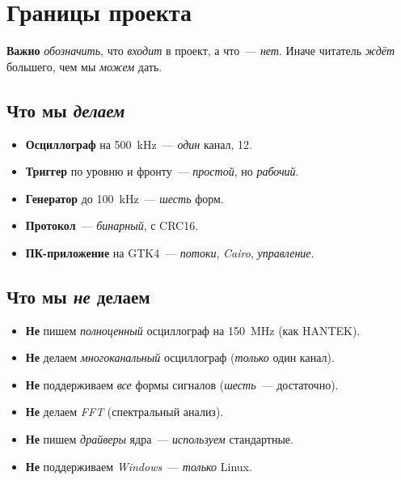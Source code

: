 \section{Границы проекта}
\label{sec:arch-boundaries}

\textbf{Важно} \emph{обозначить}, что \emph{входит} в проект,
а что~--- \emph{нет}. Иначе читатель \emph{ждёт} большего,
чем мы \emph{можем} дать.

\subsection{Что мы \emph{делаем}}

\begin{itemize}
    \item \textbf{Осциллограф} на \SI{500}{\kilo\hertz}~---
          \emph{один} канал, \SI{12}{\bit}.
    \item \textbf{Триггер} по уровню и фронту~---
          \emph{простой}, но \emph{рабочий}.
    \item \textbf{Генератор} до \SI{100}{\kilo\hertz}~---
          \emph{шесть} форм.
    \item \textbf{Протокол}~--- \emph{бинарный}, с CRC16.
    \item \textbf{ПК-приложение} на GTK4~--- \emph{потоки},
          \emph{Cairo}, \emph{управление}.
\end{itemize}

\subsection{Что мы \emph{не} делаем}

\begin{itemize}
    \item \textbf{Не} пишем \emph{полноценный} осциллограф
          на \SI{150}{\mega\hertz} (как HANTEK).
    \item \textbf{Не} делаем \emph{многоканальный} осциллограф
          (\emph{только} один канал).
    \item \textbf{Не} поддерживаем \emph{все} формы сигналов
          (\emph{шесть}~--- достаточно).
    \item \textbf{Не} делаем \emph{FFT} (спектральный анализ).
    \item \textbf{Не} пишем \emph{драйверы} ядра~---
          \emph{используем} стандартные.
    \item \textbf{Не} поддерживаем \emph{Windows}~---
          \emph{только} Linux.
\end{itemize}

